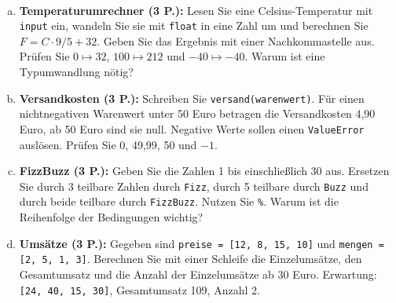 \newpage
{}\\
\begin{enumerate}[a)]
\item \textbf{Temperaturumrechner (3 P.):} Lesen Sie eine Celsius-Temperatur mit \texttt{input}
ein, wandeln Sie sie mit \texttt{float} in eine Zahl um und berechnen Sie
$F=C\cdot 9/5+32$. Geben Sie das Ergebnis mit einer Nachkommastelle aus.
Prüfen Sie $0\mapsto32$, $100\mapsto212$ und $-40\mapsto-40$.
Warum ist eine Typumwandlung nötig?
\item \textbf{Versandkosten (3 P.):} Schreiben Sie \texttt{versand(warenwert)}.
Für einen nichtnegativen Warenwert unter 50 Euro betragen die Versandkosten 4{,}90 Euro,
ab 50 Euro sind sie null. Negative Werte sollen einen \texttt{ValueError} auslösen.
Prüfen Sie 0, 49{,}99, 50 und $-1$.
\item \textbf{FizzBuzz (3 P.):} Geben Sie die Zahlen 1 bis einschließlich 30 aus.
Ersetzen Sie durch 3 teilbare Zahlen durch \texttt{Fizz}, durch 5 teilbare durch
\texttt{Buzz} und durch beide teilbare durch \texttt{FizzBuzz}.
Nutzen Sie \texttt{\%}. Warum ist die Reihenfolge der Bedingungen wichtig?
\item \textbf{Umsätze (3 P.):} Gegeben sind \texttt{preise = [12, 8, 15, 10]} und
\texttt{mengen = [2, 5, 1, 3]}. Berechnen Sie mit einer Schleife die Einzelumsätze,
den Gesamtumsatz und die Anzahl der Einzelumsätze ab 30 Euro.
Erwartung: \texttt{[24, 40, 15, 30]}, Gesamtumsatz 109, Anzahl 2.
\end{enumerate}

